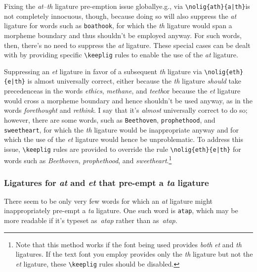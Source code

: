 \documentclass[11pt]{article}
\newcommand{\opt}[1]{\texttt{#1}}
\newcommand{\cmmd}[1]{\texttt{\textbackslash #1}}
\begin{document}
Fixing the \emph{at}--\emph{th} ligature pre-emption issue globally\textemdash e.g., via \Verb+\nolig{ath}{a|th}+\textemdash is not completely innocuous, though, because doing so will also suppress the \emph{at} ligature for words such as \opt{boathook}, for which the \emph{th} ligature would span a morpheme boundary and thus shouldn't be employed anyway. For such words, then, there's no need to suppress the \emph{at} ligature. These special cases can be dealt with by providing specific \cmmd{keeplig} rules to enable the use of the \emph{at} ligature.

Suppressing an \emph{et} ligature in favor of a subsequent \emph{th} ligature via \Verb+\nolig{eth}{e|th}+ is almost universally correct, either because the \emph{th} ligature \emph{should} take precedence\textemdash as in the words \emph{ethics}, \emph{methane}, and \emph{teeth}\textemdash or because the \emph{et} ligature would cross a morpheme boundary and hence shouldn't be used anyway, as in the words \emph{forethought} and \emph{rethink}. 
I say that it's \emph{almost} universally correct to do so; however, there are some words, such as \opt{Beethoven}, \opt{prophethood}, and \opt{sweetheart}, for which the \emph{th} ligature would be inappropriate anyway and for which the use of the \emph{et} ligature would hence be unproblematic. To address this issue, \cmmd{keeplig} rules are provided to override the rule \Verb+\nolig{eth}{e|th}+ for words such as \emph{Beethoven}, \emph{prophethood}, and \emph{sweetheart}.\footnote{Note that this method works if the font being used provides \emph{both} \emph{et} and \emph{th} ligatures. If the text font you employ provides only the \emph{th} ligature but not the \emph{et} ligature, these \cmmd{keeplig} rules should be disabled.}



\subsubsection*{Ligatures for \emph{at} and \emph{et} that pre-empt a \emph{ta} ligature}

There seem to be only very few words for which an \emph{at} ligature might inappropriately pre-empt a \emph{ta} ligature. One such word is \opt{atap}, which may be more readable if it's typeset as~\emph{atap} rather than as~\emph{\mbox{at}ap}.
\end{document}
